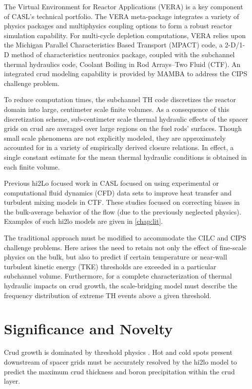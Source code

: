 The Virtual Environment for Reactor Applications (VERA) is a key component of
CASL's technical portfolio.  The VERA meta-package integrates a variety of physics
packages and multiphysics coupling options to form a robust reactor simulation
capability.  For multi-cycle depletion computations, VERA relies upon the Michigan Parallel Characteristics Based Transport (MPACT) code, a
2-D/1-D method of characteristics neutronics package, coupled with the subchannel
thermal hydraulics code, Coolant Boiling in Rod Arrays–Two Fluid (CTF).
An integrated crud modeling capability
is provided by MAMBA to address the CIPS challenge problem.

To reduce computation times, the subchannel TH code discretizes the reactor
domain into large, centimeter scale finite volumes. As a consequence of this
discretization scheme, sub-centimeter scale thermal hydraulic effects of the
spacer grids on crud are averaged over large regions on the fuel rods'
surfaces.  Though small scale phenomena are not explicitly modeled, they are
approximately accounted for in a variety of empirically derived closure
relations.  In effect, a single constant estimate for the mean thermal
hydraulic conditions is obtained in each finite volume. 

Previous hi2Lo focused work in CASL focused on using experimental or computational fluid dynamics (CFD) data sets to improve heat transfer and turbulent mixing models in CTF.  These studies focused on
correcting biases in the bulk-average behavior of the flow (due to the
previously neglected physics).  Examples of such hi2lo models are given in
\autoref{chap:lit}.

The traditional approach must be modified to accommodate the CILC and CIPS
challenge problems.  Here arises the need to retain not only the effect of
fine-scale physics on the bulk, but also to predict if certain temperature or
near-wall turbulent kinetic energy (TKE) thresholds are exceeded in a particular subchannel volume.  Furthermore, for a
complete characterization of thermal hydraulic impacts on crud growth, the
scale-bridging model must describe the frequency distribution of
extreme TH events above a given threshold.


\section{Significance and Novelty}

Crud growth is dominated by threshold physics \cite{mongoose17}.  Hot and cold spots
present downstream of spacer grids must be accurately resolved by the hi2lo model to predict the maximum crud
thickness and boron precipitation within the crud layer.

